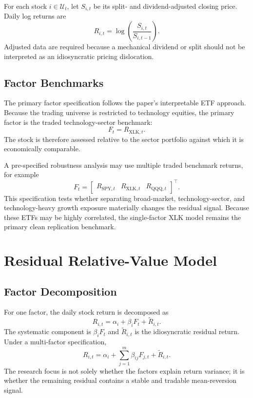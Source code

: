 \documentclass[11pt]{article}
\begin{document}
For each stock $i\in\mathcal{U}_t$, let $S_{i,t}$ be its split- and
dividend-adjusted closing price. Daily log returns are
\[
    R_{i,t} = \log\left(\frac{S_{i,t}}{S_{i,t-1}}\right).
\]
Adjusted data are required because a mechanical dividend or split should not
be interpreted as an idiosyncratic pricing dislocation.

\subsection{Factor Benchmarks}

The primary factor specification follows the paper's interpretable ETF
approach. Because the trading universe is restricted to technology equities,
the primary factor is the traded technology-sector benchmark:
\[
    F_t = R_{\mathrm{XLK},t}.
\]
The stock is therefore assessed relative to the sector portfolio against which
it is economically comparable.

A pre-specified robustness analysis may use multiple traded benchmark returns,
for example
\[
    F_t =
    \begin{bmatrix}
        R_{\mathrm{SPY},t} &
        R_{\mathrm{XLK},t} &
        R_{\mathrm{QQQ},t}
    \end{bmatrix}^{\top}.
\]
This specification tests whether separating broad-market, technology-sector,
and technology-heavy growth exposure materially changes the residual signal.
Because these ETFs may be highly correlated, the single-factor XLK model
remains the primary clean replication benchmark.

\section{Residual Relative-Value Model}

\subsection{Factor Decomposition}

For one factor, the daily stock return is decomposed as
\[
    R_{i,t}
    =
    \alpha_i
    +
    \beta_i F_t
    +
    \widetilde{R}_{i,t}.
\]
The systematic component is $\beta_i F_t$ and
$\widetilde{R}_{i,t}$ is the idiosyncratic residual return. Under a
multi-factor specification,
\[
    R_{i,t}
    =
    \alpha_i
    +
    \sum_{j=1}^{m}\beta_{ij}F_{j,t}
    +
    \widetilde{R}_{i,t}.
\]
The research focus is not solely whether the factors explain return variance;
it is whether the remaining residual contains a stable and tradable
mean-reversion signal.
\end{document}
